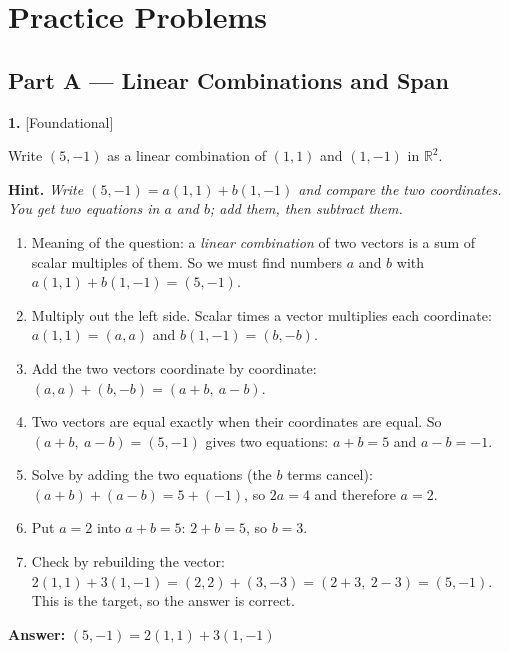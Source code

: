 \documentclass[11pt]{article}
\begin{document}
\section*{\large\color{ink} Practice Problems}
\subsection*{\normalsize\color{ink} Part A --- Linear Combinations and Span}
\begin{minipage}{\linewidth}\textbf{1.} \hfill{\scriptsize\color{ink}[Foundational]}\par\nopagebreak Write $(5,-1)$ as a linear combination of $(1,1)$ and $(1,-1)$ in $\mathbb{R}^{2}$.
\par\smallskip\begingroup\small\color{ink}\textbf{Hint.} \textit{Write $(5,-1)=a(1,1)+b(1,-1)$ and compare the two coordinates. You get two equations in $a$ and $b$; add them, then subtract them.}\endgroup
\end{minipage}\par\nopagebreak
\begin{tcolorbox}[breakable,colback=ans,colframe=ansb,boxrule=0.5pt,left=4pt,right=4pt,top=2pt,bottom=2pt]\begin{enumerate}[leftmargin=2.2em,itemsep=1pt,topsep=1pt,label=\textbf{Step \arabic*.}]\item Meaning of the question: a \emph{linear combination} of two vectors is a sum of scalar multiples of them. So we must find numbers $a$ and $b$ with $a(1,1)+b(1,-1)=(5,-1)$.
\item Multiply out the left side. Scalar times a vector multiplies each coordinate: $a(1,1)=(a,a)$ and $b(1,-1)=(b,-b)$.
\item Add the two vectors coordinate by coordinate: $(a,a)+(b,-b)=(a+b,\ a-b)$.
\item Two vectors are equal exactly when their coordinates are equal. So $(a+b,\ a-b)=(5,-1)$ gives two equations: $a+b=5$ \quad and \quad $a-b=-1$.
\item Solve by adding the two equations (the $b$ terms cancel): $(a+b)+(a-b)=5+(-1)$, so $2a=4$ and therefore $a=2$.
\item Put $a=2$ into $a+b=5$: $2+b=5$, so $b=3$.
\item Check by rebuilding the vector: $2(1,1)+3(1,-1)=(2,2)+(3,-3)=(2+3,\ 2-3)=(5,-1)$. This is the target, so the answer is correct.
\end{enumerate}\textbf{Answer:} $(5,-1)=2(1,1)+3(1,-1)$\end{tcolorbox}
\end{document}
